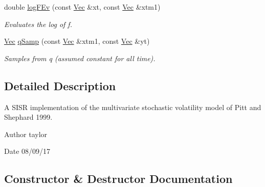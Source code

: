 \begin{DoxyCompactItemize}
double \hyperlink{classMSVolSISR_acd51af2d17300973b8fa4748e5729f3c}{log\+F\+Ev} (const \hyperlink{pmfs_8h_a4c7df05c6f5e8a0d15ae14bcdbc07152}{Vec} \&xt, const \hyperlink{pmfs_8h_a4c7df05c6f5e8a0d15ae14bcdbc07152}{Vec} \&xtm1)
\begin{DoxyCompactList}\small\item\em Evaluates the log of f. \end{DoxyCompactList}\item 
\hyperlink{pmfs_8h_a4c7df05c6f5e8a0d15ae14bcdbc07152}{Vec} \hyperlink{classMSVolSISR_a4f2f68902ba97f6dee582f1f01d1f5d7}{q\+Samp} (const \hyperlink{pmfs_8h_a4c7df05c6f5e8a0d15ae14bcdbc07152}{Vec} \&xtm1, const \hyperlink{pmfs_8h_a4c7df05c6f5e8a0d15ae14bcdbc07152}{Vec} \&yt)
\begin{DoxyCompactList}\small\item\em Samples from q (assumed constant for all time). \end{DoxyCompactList}\end{DoxyCompactItemize}


\subsection{Detailed Description}
A S\+I\+SR implementation of the multivariate stochastic volatility model of Pitt and Shephard 1999. 

\begin{DoxyAuthor}{Author}
taylor 
\end{DoxyAuthor}
\begin{DoxyDate}{Date}
08/09/17 
\end{DoxyDate}


\subsection{Constructor \& Destructor Documentation}
